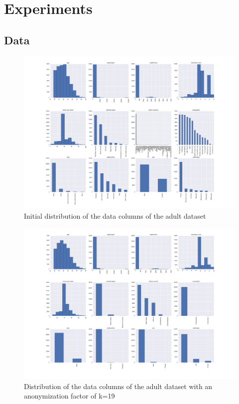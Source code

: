\documentclass{llncs}
\begin{document}
\section{Experiments}
\label{sect:experiments}


\subsection{Data} 
\label{ssect:data}


\begin{figure}[H]
	\begin{center}
		\includegraphics[width=1\textwidth]{figures/experiment/initial_distribution}
		\caption{Initial distribution of the data columns of the adult dataset}
		\label{fig:adult_original_distribution}
	\end{center}
\end{figure}

\begin{figure}[H]
	\begin{center}
		\includegraphics[width=1\textwidth]{figures/experiment/anon_distribution}
		\caption{Distribution of the data columns of the adult dataset with an anonymization factor of k=19}
		\label{fig:adult_anonymized_distribution}
	\end{center}
\end{figure}
\end{document}
